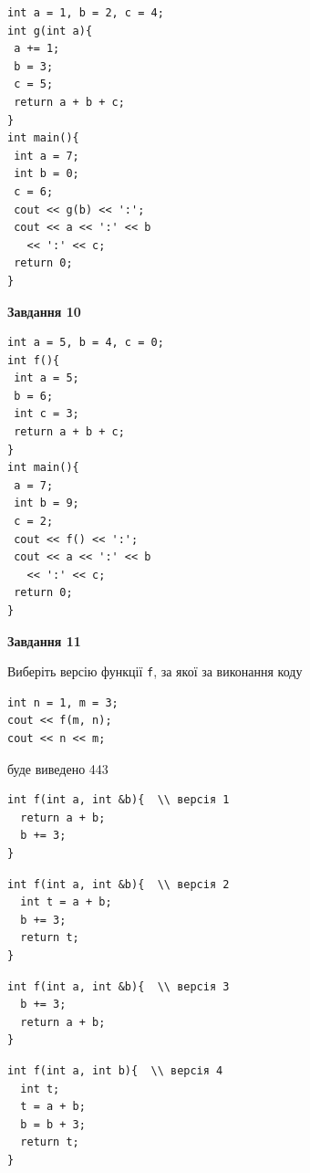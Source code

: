 \documentclass[12pt, ukrainian]{article}
\def\code#1{\Verb!#1!}
\begin{document}
{\begin {large}
\begin{minipage}[t]{7.0cm}
\begin{verbatim}
int a = 1, b = 2, c = 4;
int g(int a){
 a += 1;
 b = 3;
 c = 5;
 return a + b + c;
}
int main(){
 int a = 7;
 int b = 0;
 c = 6;
 cout << g(b) << ':';
 cout << a << ':' << b 
   << ':' << c;
 return 0;
}
\end{verbatim}



\begin{center}
\textbf{Завдання 10}
\end{center}
\vspace{-8mm}

\begin{verbatim}
int a = 5, b = 4, c = 0;
int f(){
 int a = 5;
 b = 6;
 int c = 3;
 return a + b + c;
}
int main(){
 a = 7;
 int b = 9;
 c = 2;
 cout << f() << ':';
 cout << a << ':' << b 
   << ':' << c;
 return 0;
}
\end{verbatim}

\end{minipage}
\vline \hspace{1mm}
\begin{minipage}[t]{11.0cm}

\begin{center}
\textbf{Завдання 11}
\end{center}
Виберіть версію функції \code{f}, за якої за виконання коду
\begin{verbatim}
int n = 1, m = 3;
cout << f(m, n);
cout << n << m;
\end{verbatim}

буде виведено 443

\begin{verbatim}
int f(int a, int &b){  \\ версія 1
  return a + b;
  b += 3;
}
\end{verbatim}

\vspace{-8mm}\begin{verbatim}
int f(int a, int &b){  \\ версія 2
  int t = a + b;
  b += 3;
  return t;
}
\end{verbatim}

\vspace{-8mm}\begin{verbatim}
int f(int a, int &b){  \\ версія 3
  b += 3;
  return a + b;
}
\end{verbatim}

\vspace{-8mm}\begin{verbatim}
int f(int a, int b){  \\ версія 4
  int t;
  t = a + b;
  b = b + 3;
  return t;
}
\end{verbatim}




\end{minipage}
\end{large}}
\end{document}
